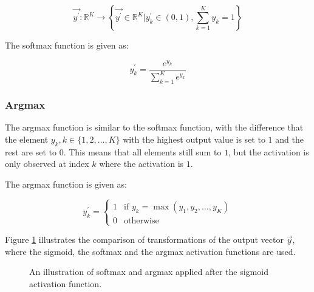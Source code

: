 \begin{equation}
    \vec{y^{'}} \colon \mathbb{R}^{K} \to \left\{\vec{y^{'}} \in \mathbb{R}^{K} \vert y^{'}_k \in (0,1), \sum_{k=1}^{K} y_k = 1\right\}
    \label{eq:sum_after_softmax}
\end{equation}

\noindent The softmax function is given as:

\begin{equation}
    y^{'}_k = \frac{e^{y_k}}{\sum_{k = 1}^{K}e^{y_k}}
    \label{eq:softmax}
\end{equation}


\subsubsection{Argmax}
\label{sec:anns:an:output:argmax}

The argmax function is similar to the softmax
function, with the difference that the element $y_k, k \in \{1,2, \dots, K\}$
with the highest output value is set to $1$ and the rest are set to $0$. This
means that all elements still sum to $1$, but the activation is only observed at
index $k$ where the activation is $1$.

The argmax function is given as:

\begin{equation}
    y^{'}_k = 
    \begin{cases}
        1 & \text{if $y_k = \max(y_1, y_2, \dots, y_K)$}\\
        0 & \text{otherwise}
        \label{eq:argmax}
    \end{cases}
\end{equation}

\noindent Figure \ref{fig:anns:activation_functions:softmax_argmax} illustrates the comparison of
transformations of the output vector $\vec{y}$, where the
sigmoid, the softmax and the argmax
activation functions are used.


\begin{figure}[htpb]
    \centering
    \resizebox{0.8\textwidth}{!}{}
    \caption[The results of softmax and argmax]{An
        illustration of softmax and argmax applied
    after the sigmoid activation function.}
    \label{fig:anns:activation_functions:softmax_argmax}
\end{figure}


